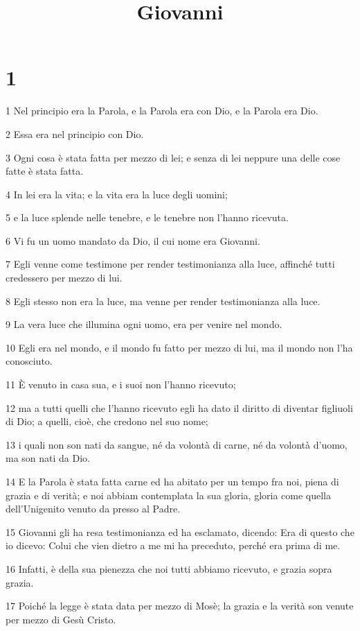 

\title{Giovanni}


\chapter{1}

\par 1 Nel principio era la Parola, e la Parola era con Dio, e la Parola era Dio.
\par 2 Essa era nel principio con Dio.
\par 3 Ogni cosa è stata fatta per mezzo di lei; e senza di lei neppure una delle cose fatte è stata fatta.
\par 4 In lei era la vita; e la vita era la luce degli uomini;
\par 5 e la luce splende nelle tenebre, e le tenebre non l'hanno ricevuta.
\par 6 Vi fu un uomo mandato da Dio, il cui nome era Giovanni.
\par 7 Egli venne come testimone per render testimonianza alla luce, affinché tutti credessero per mezzo di lui.
\par 8 Egli stesso non era la luce, ma venne per render testimonianza alla luce.
\par 9 La vera luce che illumina ogni uomo, era per venire nel mondo.
\par 10 Egli era nel mondo, e il mondo fu fatto per mezzo di lui, ma il mondo non l'ha conosciuto.
\par 11 È venuto in casa sua, e i suoi non l'hanno ricevuto;
\par 12 ma a tutti quelli che l'hanno ricevuto egli ha dato il diritto di diventar figliuoli di Dio; a quelli, cioè, che credono nel suo nome;
\par 13 i quali non son nati da sangue, né da volontà di carne, né da volontà d'uomo, ma son nati da Dio.
\par 14 E la Parola è stata fatta carne ed ha abitato per un tempo fra noi, piena di grazia e di verità; e noi abbiam contemplata la sua gloria, gloria come quella dell'Unigenito venuto da presso al Padre.
\par 15 Giovanni gli ha resa testimonianza ed ha esclamato, dicendo: Era di questo che io dicevo: Colui che vien dietro a me mi ha preceduto, perché era prima di me.
\par 16 Infatti, è della sua pienezza che noi tutti abbiamo ricevuto, e grazia sopra grazia.
\par 17 Poiché la legge è stata data per mezzo di Mosè; la grazia e la verità son venute per mezzo di Gesù Cristo.
